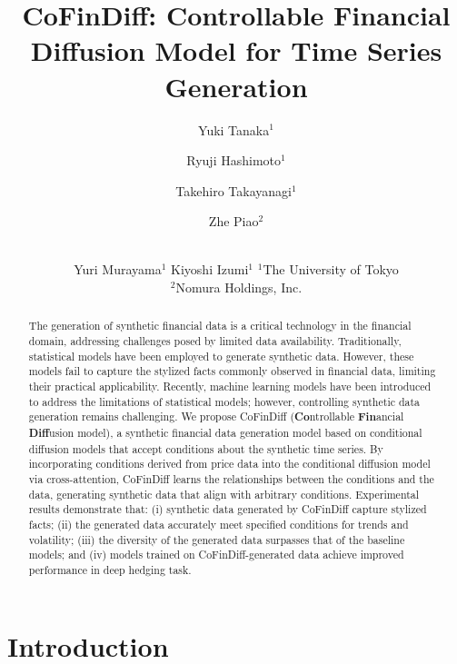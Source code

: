 \documentclass{article}
\title{CoFinDiff: Controllable Financial Diffusion Model for Time Series Generation}
\author{
Yuki Tanaka$^1$
\and
Ryuji Hashimoto$^1$
\and
Takehiro Takayanagi$^1$
\and
Zhe Piao$^2$
\and \\
Yuri Murayama$^1$
\And
Kiyoshi Izumi$^1$
\affiliations
$^1$The University of Tokyo\\
$^2$Nomura Holdings, Inc.\\ 
}
\begin{document}
\maketitle

\begin{abstract}
The generation of synthetic financial data is a critical technology in the financial domain, addressing challenges posed by limited data availability. Traditionally, statistical models have been employed to generate synthetic data. However, these models fail to capture the stylized facts commonly observed in financial data, limiting their practical applicability. Recently, machine learning models have been introduced to address the limitations of statistical models; however, controlling synthetic data generation remains challenging. 
We propose CoFinDiff (\textbf{Co}ntrollable \textbf{Fin}ancial \textbf{Diff}usion model), a synthetic financial data generation model based on conditional diffusion models that accept conditions about the synthetic time series. 
By incorporating conditions derived from price data into the conditional diffusion model via cross-attention, CoFinDiff learns the relationships between the conditions and the data, generating synthetic data that align with arbitrary conditions. Experimental results demonstrate that: (i) synthetic data generated by CoFinDiff capture stylized facts; (ii) the generated data accurately meet specified conditions for trends and volatility; (iii) the diversity of the generated data surpasses that of the baseline models; and (iv) models trained on CoFinDiff-generated data achieve improved performance in deep hedging task.

\end{abstract}

\section{Introduction}
\end{document}
